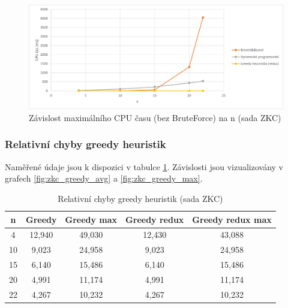 \documentclass[12pt]{article}
\begin{document}
\begin{figure}[ht]\centering
    \includegraphics[width=1\textwidth, keepaspectratio]{graphs/ZKC/times/zkc_cpu_time_max_without_brute_force.png}
    \caption{Závislost maximálního CPU času (bez BruteForce) na n (sada ZKC)}
    \label{fig:zkc_cpu_time_max_without_brute_force}
\end{figure}

\subsubsection{Relativní chyby greedy heuristik}

Naměřené údaje jsou k dispozici v tabulce \ref{tab:zkc_greedy_error}. Závislosti jsou vizualizovány v grafech \ref{fig:zkc_greedy_avg} a \ref{fig:zkc_greedy_max}.

\begin{table}
    \begin{center}
         \begin{tabular}{|c | c | c | c | c|} 
         \hline
         n & Greedy & Greedy max & Greedy redux & Greedy redux max \\ [0.1ex] 
         \hline\hline
        4 & 12,940 & 49,030 & 12,430 & 43,088 \\
         \hline
        10 & 9,023 & 24,958 & 9,023 & 24,958 \\
        \hline
        15 & 6,140 & 15,486 & 6,140 & 15,486 \\
        \hline
        20 & 4,991 & 11,174 & 4,991 & 11,174 \\
        \hline
        22 & 4,267 & 10,232 & 4,267 & 10,232 \\
        \hline
        \end{tabular}
        \caption{Relativní chyby greedy heuristik (sada ZKC)} \label{tab:zkc_greedy_error}
    \end{center}
\end{table}
\end{document}
